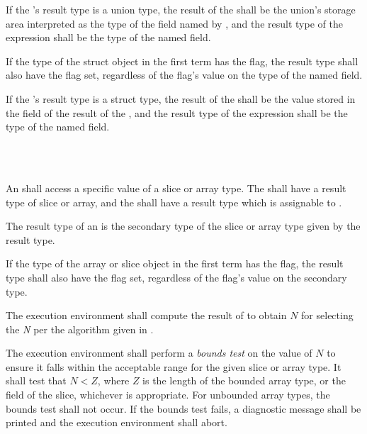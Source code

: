 \specsubsubitem
If the 's result type is a union type, the
result of the  shall be the union's storage
area interpreted as the type of the field named by , and the
result type of the expression shall be the type of the named field.

\specsubsubitem
If the type of the struct object in the first term has the 
flag, the result type shall also have the  flag set, regardless
of the flag's value on the type of the named field.

\specsubsubitem
If the 's result type is a struct type,
the result of the  shall be the value
stored in the  field of the result of the
, and the result type of the expression shall be
the type of the named field.


\begin{grammar}
 \\
	 \terminal{[}  \terminal{]} \\
\end{grammar}

\specsubsubitem
An  shall access a specific value of a slice
or array type. The  shall have a result type of
slice or array, and the  shall have a result
type which is assignable to .

\specsubsubitem
The result type of an  is the secondary type
of the slice or array type given by the  result
type.

\specsubsubitem
If the type of the array or slice object in the first term has the
 flag, the result type shall also have the 
flag set, regardless of the flag's value on the secondary type.

\specsubsubitem
The execution environment shall compute the result of
 to obtain $N$ for selecting the \textit{N} per
the algorithm given in .

\specsubsubitem
The execution environment shall perform a \textit{bounds test} on the value of
$N$ to ensure it falls within the acceptable range for the given slice or array
type. It shall test that $N < Z$, where $Z$ is the length of the bounded array
type, or the  field of the slice, whichever is appropriate.  For
unbounded array types, the bounds test shall not occur. If the bounds test
fails, a diagnostic message shall be printed and the execution environment
shall abort.

